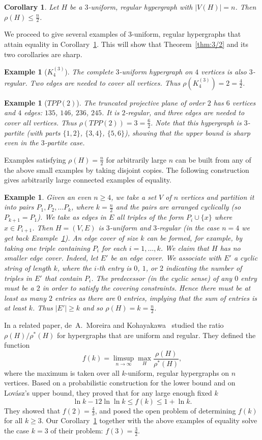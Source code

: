 \documentclass[10pt,a4paper]{amsart}
\newtheorem{corollary}[theorem]{Corollary}
\newtheorem{example}[theorem]{Example}
\begin{document}
\begin{corollary} \label{cor:Reg}
Let $H$ be a $3$-uniform, regular hypergraph with $|V(H)|=n$. Then $\rho(H) \le \frac{n}{2}$.
\end{corollary}
We proceed to give several examples of $3$-uniform, regular hypergraphs that attain equality in Corollary~\ref{cor:Reg}. This will show that Theorem~\ref{thm:3/2} and its two corollaries are sharp.
\begin{example}[$K^{(3)}_4$] \label{ex:1}
The complete $3$-uniform hypergraph on $4$ vertices is also $3$-regular. Two edges are needed to cover all vertices. Thus $\rho(K^{(3)}_4) = 2 = \frac{4}{2}$.
\end{example}
\begin{example}[$TPP(2)$] \label{ex:2}
The truncated projective plane of order $2$ has $6$ vertices and $4$ edges: $135$, $146$, $236$, $245$. It is $2$-regular, and three edges are needed to cover all vertices. Thus $\rho(TPP(2)) = 3 = \frac{6}{2}$. Note that this hypergraph is $3$-partite (with parts $\{1,2\}$, $\{3,4\}$, $\{5,6\}$), showing that the upper bound is sharp even in the $3$-partite case.
\end{example}
Examples satisfying $\rho(H) = \frac{n}{2}$ for arbitrarily large $n$ can be built from any of the above small examples by taking disjoint copies. The following construction gives arbitrarily large connected examples of equality.
\begin{example} \label{ex:3}
Given an even $n \ge 4$, we take a set $V$ of $n$ vertices and partition it into pairs $P_1, P_2, \ldots P_k$, where $k = \frac{n}{2}$ and the pairs are arranged cyclically (so $P_{k+1} = P_1$). We take as edges in $E$ all triples of the form $P_i \cup \{x\}$ where $x \in P_{i+1}$. Then $H=(V,E)$ is $3$-uniform and $3$-regular (in the case $n=4$ we get back Example~\ref{ex:1}). An edge cover of size $k$ can be formed, for example, by taking one triple containing $P_i$ for each $i=1, \ldots ,k$. We claim that $H$ has no smaller edge cover. Indeed, let $E'$ be an edge cover. We associate with $E'$ a cyclic string of length $k$, where the $i$-th entry is $0$, $1$, or $2$ indicating the number of triples in $E'$ that contain $P_i$. The predecessor (in the cyclic sense) of any $0$ entry must be a $2$ in order to satisfy the covering constraints. Hence there must be at least as many $2$ entries as there are $0$ entries, implying that the sum of entries is at least $k$. Thus $|E'| \ge k$ and so $\rho(H) = k = \frac{n}{2}$.
\end{example}
In a related paper, de~A.~Moreira and Kohayakawa~\cite{dK} studied the ratio $\rho(H)/\rho^*(H)$ for hypergraphs that are uniform and regular. They defined the function \[ f(k) = \limsup_{n \to \infty} \max_H \frac{\rho(H)}{\rho^*(H)},\] where the maximum is taken over all $k$-uniform, regular hypergraphs on $n$ vertices. Based on a probabilistic construction for the lower bound and on Lov\'asz's upper bound, they proved that for any large enough fixed $k$ \[ \ln k - 12 \ln\ln k \le f(k) \le 1 + \ln k.\] They showed that $f(2) = \frac{4}{3}$, and posed the open problem of determining $f(k)$ for all $k \ge 3$. Our Corollary~\ref{cor:Reg} together with the above examples of equality solve the case $k=3$ of their problem: $f(3) = \frac{3}{2}$.
\end{document}
